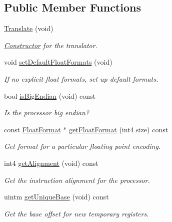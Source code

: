 \subsection*{Public Member Functions}
\begin{DoxyCompactItemize}
\item 
\mbox{\hyperlink{class_translate_a441f5adef52843f104286f5b921775cc}{Translate}} (void)
\begin{DoxyCompactList}\small\item\em \mbox{\hyperlink{class_constructor}{Constructor}} for the translator. \end{DoxyCompactList}\item 
void \mbox{\hyperlink{class_translate_af3405dfdc80d8742a482193f030601ed}{set\+Default\+Float\+Formats}} (void)
\begin{DoxyCompactList}\small\item\em If no explicit float formats, set up default formats. \end{DoxyCompactList}\item 
bool \mbox{\hyperlink{class_translate_acd3fd0f02883a26e882c46872324adb8}{is\+Big\+Endian}} (void) const
\begin{DoxyCompactList}\small\item\em Is the processor big endian? \end{DoxyCompactList}\item 
const \mbox{\hyperlink{class_float_format}{Float\+Format}} $\ast$ \mbox{\hyperlink{class_translate_ae501a3e3bdaee00d49ed9f2b8545e6c8}{get\+Float\+Format}} (int4 size) const
\begin{DoxyCompactList}\small\item\em Get format for a particular floating point encoding. \end{DoxyCompactList}\item 
int4 \mbox{\hyperlink{class_translate_aeb013fbe5257988ffea2f8147b96620a}{get\+Alignment}} (void) const
\begin{DoxyCompactList}\small\item\em Get the instruction alignment for the processor. \end{DoxyCompactList}\item 
uintm \mbox{\hyperlink{class_translate_a5373fc652ce0b12cd646e4d4befbea25}{get\+Unique\+Base}} (void) const
\begin{DoxyCompactList}\small\item\em Get the base offset for new temporary registers. \end{DoxyCompactList}\item 

\end{DoxyCompactItemize}

